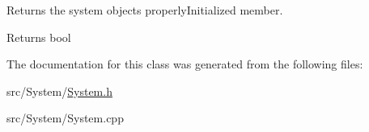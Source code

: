 Returns the system object\textquotesingle{}s properly\+Initialized member. 

\begin{DoxyReturn}{Returns}
bool 
\end{DoxyReturn}


The documentation for this class was generated from the following files\+:\begin{DoxyCompactItemize}
\item 
src/\+System/\hyperlink{System_8h}{System.\+h}\item 
src/\+System/System.\+cpp\end{DoxyCompactItemize}
